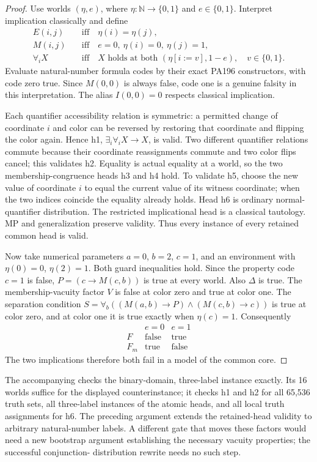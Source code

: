 \begin{proof}

Use worlds $(\eta,e)$, where $\eta:\mathbb N\to\{0,1\}$ and
$e\in\{0,1\}$. Interpret implication classically and define
\begin{align*}
 E(i,j)&\quad\text{iff}\quad\eta(i)=\eta(j),\\
 M(i,j)&\quad\text{iff}\quad
     e=0,\ \eta(i)=0,\ \eta(j)=1,\\
 \forall_i X&\quad\text{iff}\quad
     X\text{ holds at both }(\eta[i:=v],1-e),\quad v\in\{0,1\}.
\end{align*}
Evaluate natural-number formula codes by their exact PA196
constructors, with code zero true. Since $M(0,0)$ is always false,
code one is a genuine falsity in this interpretation. The alias
$I(0,0)=0$ respects classical implication.

Each quantifier accessibility relation is symmetric: a permitted
change of coordinate $i$ and color can be reversed by restoring that
coordinate and flipping the color again. Hence h1,
$\exists_i\forall_i X\to X$, is valid. Two different quantifier
relations commute because their coordinate reassignments commute
and two color flips cancel; this validates h2. Equality is actual
equality at a world, so the two membership-congruence heads h3 and
h4 hold. To validate h5, choose the new value of coordinate $i$ to
equal the current value of its witness coordinate; when the two
indices coincide the equality already holds. Head h6 is ordinary
normal-quantifier distribution. The restricted implicational head
is a classical tautology. MP and generalization preserve validity.
Thus every instance of every retained common head is valid.

Now take numerical parameters $a=0$, $b=2$, $c=1$, and an environment
with $\eta(0)=0$, $\eta(2)=1$. Both guard inequalities hold. Since
the property code $c=1$ is false, $P=(c\to M(c,b))$ is true at every
world. Also $\Delta$ is true. The membership-vacuity factor $V$ is
false at color zero and true at color one. The separation condition
$S=\forall_b((M(a,b)\to P)\wedge(M(c,b)\to c))$ is true at color
zero, and at color one it is true exactly when $\eta(c)=1$.
Consequently
\[
\begin{array}{c|cc}
 & e=0 & e=1\\\hline
 F & \text{false} & \text{true}\\
 F_m & \text{true} & \text{false}
\end{array}
\]
The two implications therefore both fail in a model of the common
core.
\end{proof}

The accompanying  checks the binary-domain,
three-label instance exactly. Its 16 worlds suffice for the displayed
counterinstance; it checks h1 and h2 for all 65,536 truth sets, all
three-label instances of the atomic heads, and all local truth
assignments for h6. The preceding argument extends the retained-head
validity to arbitrary natural-number labels. A different gate that
moves these factors would need a new bootstrap argument establishing
the necessary vacuity properties; the successful conjunction-
distribution rewrite needs no such step.
